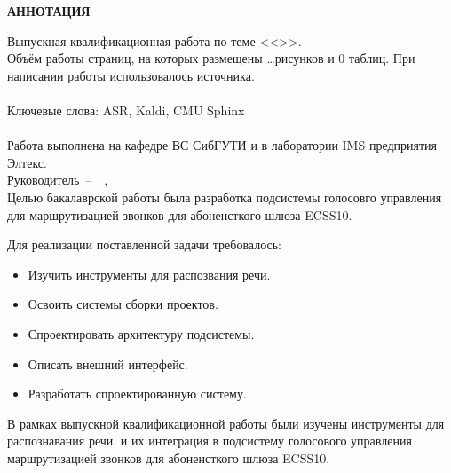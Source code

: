 \begin{center}
    \bf
    АННОТАЦИЯ
\end{center}


\noindent
Выпускная квалификационная работа \fioa \linebreak
по теме <<\topicname>>.\linebreak
\hfill \\
Объём работы \pageref{LastPage} страниц, на которых размещены \dots рисунков
и 0 таблиц. При написании работы использовалось  источника. \\
\hfill \\
Ключевые слова: ASR, Kaldi, CMU Sphinx \\
\hfill \\
Работа выполнена на кафедре ВС СибГУТИ и в лаборатории IMS предприятия Элтекс. \\
Руководитель~--~\theadpos~\thead, \\


Целью бакалаврской работы была разработка подсистемы голосовго управления
для маршрутизацией звонков для абоненсткого шлюза ECSS10.


Для реализации поставленной задачи требовалось:
\begin{itemize}
    \item Изучить инструменты для распозвания речи.
    \item Освоить системы сборки проектов.
    \item Спроектировать архитектуру подсистемы.
    \item Описать внешний интерфейс.
    \item Разработать спроектированную систему.
\end{itemize}


В рамках выпускной квалификационной работы были изучены инструменты для
распознавания речи, и их интеграция в подсистему голосового управления
маршрутизацией звонков для абоненсткого шлюза ECSS10.


\thispagestyle{empty}
